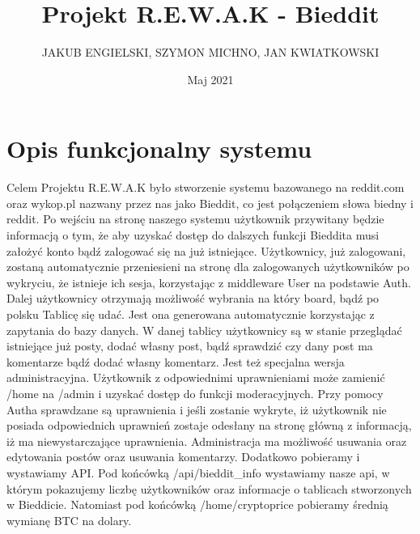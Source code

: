 \documentclass{article}
\title{Projekt R.E.W.A.K - Bieddit}
\author{JAKUB ENGIELSKI, SZYMON MICHNO, JAN KWIATKOWSKI}
\date{Maj 2021}
\begin{document}
\maketitle

\section{Opis funkcjonalny systemu}
Celem Projektu R.E.W.A.K było stworzenie systemu bazowanego na reddit.com oraz wykop.pl nazwany przez nas jako Bieddit, co jest połączeniem słowa biedny i reddit.
Po wejściu na stronę naszego systemu użytkownik przywitany będzie informacją o tym, że aby uzyskać dostęp do dalszych funkcji Bieddita musi założyć konto bądź zalogować się na już istniejące. Użytkownicy, już zalogowani, zostaną automatycznie przeniesieni na stronę dla zalogowanych użytkowników po wykryciu, że istnieje ich sesja, korzystając z middleware User na podstawie Auth.
Dalej użytkownicy otrzymają możliwość wybrania na który board, bądź po polsku Tablicę się udać. Jest ona generowana automatycznie korzystając z zapytania do bazy danych.
W danej tablicy użytkownicy są w stanie przeglądać istniejące już posty, dodać własny post, bądź sprawdzić czy dany post ma komentarze bądź dodać własny komentarz.
Jest też specjalna wersja administracyjna. Użytkownik z odpowiednimi uprawnieniami może zamienić /home na /admin i uzyskać dostęp do funkcji moderacyjnych. Przy pomocy Autha sprawdzane są uprawnienia i jeśli zostanie wykryte, iż użytkownik nie posiada odpowiednich uprawnień zostaje odesłany na stronę główną z informacją, iż ma niewystarczające uprawnienia. Administracja ma możliwość usuwania oraz edytowania postów oraz usuwania komentarzy.
Dodatkowo pobieramy i wystawiamy API.
Pod końcówką /api/bieddit\_info wystawiamy nasze api, w którym pokazujemy liczbę użytkowników oraz informacje o tablicach stworzonych w Bieddicie.
Natomiast pod końcówką /home/cryptoprice pobieramy średnią wymianę BTC na dolary.
\end{document}
